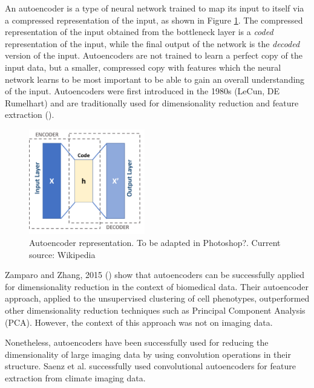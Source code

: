 An autoencoder is a type of neural network trained to map its input to itself via a compressed representation of the input, as shown in Figure \ref{fig:autoencoder}. The compressed representation of the input obtained from the bottleneck layer is a \textit{coded} representation of the input, while the final output of the network is the \textit{decoded} version of the input. Autoencoders are not trained to learn a perfect copy of the input data, but a smaller, compressed copy with features which the neural network learns to be most important to be able to gain an overall understanding of the input. Autoencoders were first introduced in the 1980s (LeCun, DE Rumelhart) and are traditionally used for dimensionality reduction and feature extraction (\cite{http://www.deeplearningbook.org/contents/autoencoders.html}).

\begin{figure}[h!]
    \centering
    \includegraphics[width=0.45\textwidth]{dissertation/figures/autoencoder_schema.png}
    \caption{Autoencoder representation. To be adapted in Photoshop?. Current source: Wikipedia}
    \label{fig:autoencoder}
\end{figure}

Zamparo and Zhang, 2015 (\cite{https://arxiv.org/pdf/1501.01348.pdf}) show that autoencoders can be successfully applied for dimensionality reduction in the context of biomedical data. Their autoencoder approach, applied to the unsupervised clustering of cell phenotypes, outperformed other dimensionality reduction techniques such as Principal Component Analysis (PCA). However, the context of this approach was not on imaging data.

Nonetheless, autoencoders have been successfully used for reducing the dimensionality of large imaging data by using convolution operations in their structure. Saenz et al. successfully used convolutional autoencoders for feature extraction from climate imaging data. %

